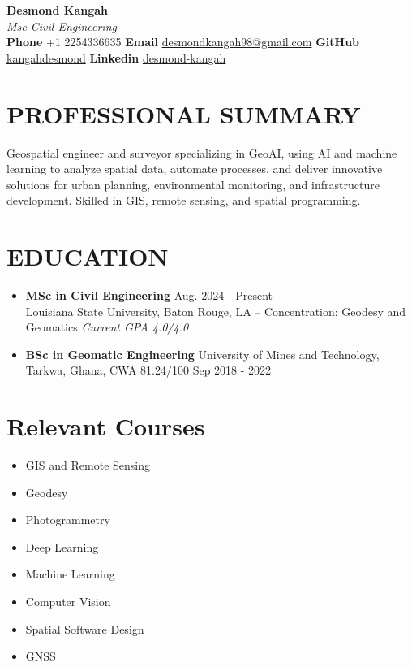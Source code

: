 \documentclass[a4paper,10pt]{article}
\begin{document}
\sloppy %
\begin{center}
    {\huge \textbf{Desmond Kangah}}\\
    \textit{Msc Civil Engineering}\\
    \textbf{Phone}  +1 2254336635 \quad
    \textbf{Email} \href{desmondkangah98@gmail.com}{desmondkangah98@gmail.com} \quad
    \textbf{GitHub} \href{https://github.com/kangahdesmond}{kangahdesmond}
    \textbf{Linkedin} \href{https://www.linkedin.com/in/desmond-kangah-629b9a27b/}{desmond-kangah}
\end{center}

\section*{PROFESSIONAL SUMMARY}
Geospatial engineer and surveyor specializing in GeoAI, using AI and machine learning 
to analyze spatial data, automate processes, and deliver innovative solutions for 
urban planning, environmental monitoring, and infrastructure development. 
Skilled in GIS, remote sensing, and spatial programming.

\section*{EDUCATION}
\begin{itemize}[leftmargin=*, noitemsep]
    \item \textbf{MSc in Civil Engineering} \hfill Aug. 2024 {-} Present \\
    Louisiana State University, Baton Rouge, LA {--} Concentration: Geodesy and Geomatics \qquad
    \textit{Current GPA 4.0/4.0\@}
    \item \textbf{BSc in Geomatic Engineering}  \quad
    University of Mines and Technology, Tarkwa, Ghana, CWA 81.24/100 \hfill Sep 2018 {-} 2022
\end{itemize}

 \section*{Relevant Courses}
 \begin{multicols}{4} %
 \begin{itemize}[leftmargin=*]
     \item GIS and Remote Sensing
     \item Geodesy
     \item Photogrammetry
     \item Deep Learning
     \item Machine Learning
     \item Computer Vision
     \item Spatial Software Design
     \item GNSS
 \end{itemize}
 \end{multicols}
\end{document}
